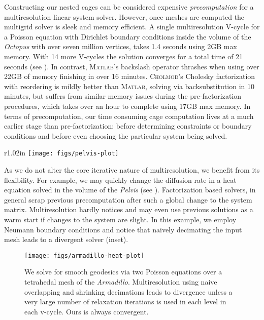 



%
Constructing our nested cages can be considered expensive \emph{precomputation}
for a multiresolution linear system solver.
%
However, once meshes are computed the multigrid solver is sleek and memory
efficient.
%
A single multiresolution V-cycle for a Poisson equation with Dirichlet boundary
conditions inside the volume of the \emph{Octopus} with over seven million
vertices, takes 1.4 seconds using 2GB max memory. With 14 more V-cycles the
solution converges for a total time of 21 seconds (see
).
%
In contrast, \textsc{Matlab}'s backslash operator thrashes when using over 22GB
of memory finishing in over 16 minutes.
%
\textsc{Cholmod}'s Cholesky factorization with reordering is mildly better than
\textsc{Matlab}, solving via backsubstitution in 10 minutes, but suffers from
similar memory issues during the pre-factorization procedures, which takes over
an hour to complete using 17GB max memory.
%
In terms of precomputation, our time consuming cage computation lives at a much
earlier stage than pre-factorization: before determining constraints or
boundary conditions and before even choosing the particular system being
solved.

\begin{wrapfigure}{r}{1.02in}
%
\centering
%
\texttt{[image: figs/pelvis-plot]}
%
\end{wrapfigure}
%
As we do not alter the core iterative nature of multiresolution, we benefit
from its flexibility. For example, we may quickly change the diffusion rate in
a heat equation solved in the volume of the \emph{Pelvis} (see
). 
%
Factorization based solvers, in general scrap previous precomputation after
such a global change to the system matrix. 
%
Multiresolution hardly notices and may even use previous solutions as a warm
start if changes to the system are slight.
%
In this example, we employ Neumann boundary conditions and notice that naively
decimating the input mesh leads to a divergent solver (inset).

\begin{figure}
  \texttt{[image: figs/armadillo-heat-plot]}
  \caption{We solve for smooth geodesics via two Poisson equations over a
  tetrahedal mesh of the \emph{Armadillo}. Multiresolution using naive
  overlapping and shrinking decimations leads to divergence unless a very large
  number of relaxation iterations is used in each level in each v-cycle. Ours
  is always convergent.}
  \label{fig:armadillo-heat-plot}
\end{figure}

